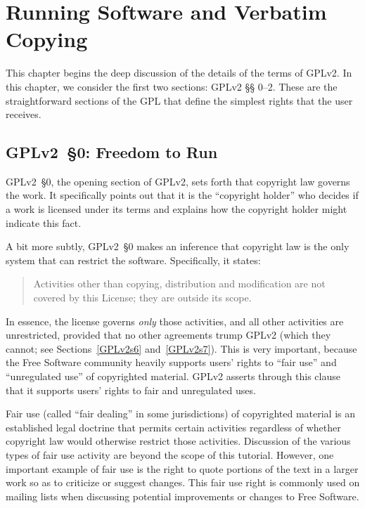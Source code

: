 \chapter{Running Software and Verbatim Copying}
\label{run-and-verbatim}


This chapter begins the deep discussion of the details of the terms of
GPLv2\@. In this chapter, we consider the first two sections: GPLv2 \S\S
0--2. These are the straightforward sections of the GPL that define the
simplest rights that the user receives.

\section{GPLv2~\S0: Freedom to Run}
\label{GPLv2s0}

GPLv2~\S0, the opening section of GPLv2, sets forth that copyright law governs
the work.  It specifically points out that it is the ``copyright
holder'' who decides if a work is licensed under its terms and explains
how the copyright holder might indicate this fact.

A bit more subtly, GPLv2~\S0 makes an inference that copyright law is the only
system that can restrict the software.  Specifically, it states:
\begin{quote}
Activities other than copying, distribution and modification are not
covered by this License; they are outside its scope.
\end{quote}
In essence, the license governs \emph{only} those activities, and all other
activities are unrestricted, provided that no other agreements trump GPLv2
(which they cannot; see Sections~\ref{GPLv2s6} and~\ref{GPLv2s7}).  This is
very important, because the Free Software community heavily supports
users' rights to ``fair use'' and ``unregulated use'' of copyrighted
material.  GPLv2 asserts through this clause that it supports users' rights
to fair and unregulated uses.

Fair use (called ``fair dealing'' in some jurisdictions) of copyrighted
material is an established legal doctrine that permits certain activities
regardless of whether copyright law would otherwise restrict those activities.
Discussion of the various types of fair use activity are beyond the scope of
this tutorial.  However, one important example of fair use is the right to
quote portions of the text in a larger work so as to criticize or suggest
changes.  This fair use right is commonly used on mailing lists when
discussing potential improvements or changes to Free Software.

